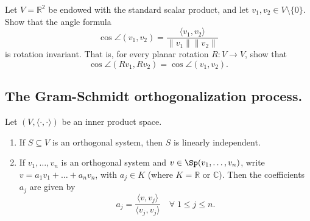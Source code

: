 \begin{exercise}
  \label{exc:rotation_invariance_angle}
  Let $V = \mathbb{R}^2$ be endowed with the standard scalar product, and let $v_1, v_2 \in V \setminus \{0\}$. Show that the angle formula
  \[
  \cos \angle(v_1, v_2) = \frac{\langle v_1, v_2 \rangle}{\|v_1\| \|v_2\|}
  \]
  is rotation invariant. That is, for every planar rotation $R: V \to V$, show that
  \[
  \cos \angle(R v_1, R v_2) = \cos \angle(v_1, v_2).
  \]
\end{exercise}

\subsection*{The Gram-Schmidt orthogonalization process.}

\begin{theorem}
\label{thm:properties_orthogonal_systems}
    Let $(V, \langle \cdot, \cdot \rangle)$ be an inner product space.
    \begin{enumerate}[label=\textbf{(\alph*)}]
        \item If $S \subseteq V$ is an orthogonal system, then $S$ is linearly independent.
        \item If $v_1, \dots, v_n$ is an orthogonal system and $v \in \Sp(v_1, \dots, v_n)$, write $v = a_1 v_1 + \dots + a_n v_n$, with $a_j \in K$ (where $K = \mathbb{R}$ or $\mathbb{C}$). Then the coefficients $a_j$ are given by 
        \[
            a_j = \frac{\langle v, v_j \rangle}{\langle v_j, v_j \rangle} \quad \forall \; 1 \leq j \leq n.
        \]
    \end{enumerate}
\end{theorem}

